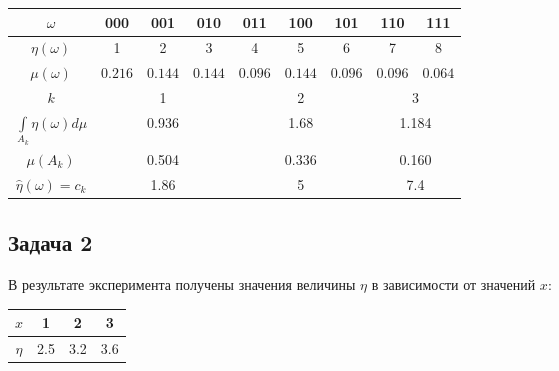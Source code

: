 \documentclass[a4paper,12pt]{article}
\begin{document}
\begin{center}
    \begin{tabular}{|c|c|c|c|c|c|c|c|c|}
        \hline
        $\omega$                                & 000                         & 001                         & 010                         & 011     & 100     & 101     & 110     & 111     \\
        \hline
        $\eta(\omega)$                          & 1                           & 2                           & 3                           & 4       & 5       & 6       & 7       & 8       \\
        \hline
        $\mu(\omega)$                           & $0.216$                     & $0.144$                     & $0.144$                     & $0.096$ & $0.144$ & $0.096$ & $0.096$ & $0.064$ \\
        \hline
        $k$                                     & \multicolumn{3}{|c|}{1}     & \multicolumn{3}{|c|}{2}     & \multicolumn{2}{|c|}{3}                                                       \\
        \hline
        $\int \limits_{A_k} \eta(\omega) d \mu$ & \multicolumn{3}{|c|}{0.936} & \multicolumn{3}{|c|}{1.68}  & \multicolumn{2}{|c|}{1.184}                                                   \\
        \hline
        $\mu(A_k)$                              & \multicolumn{3}{|c|}{0.504} & \multicolumn{3}{|c|}{0.336} & \multicolumn{2}{|c|}{0.160}                                                   \\
        \hline
        $\widehat{\eta}(\omega) = c_k$          & \multicolumn{3}{|c|}{1.86}  & \multicolumn{3}{|c|}{5}     & \multicolumn{2}{|c|}{7.4}                                                     \\
        \hline
    \end{tabular}
\end{center}


\subsection*{Задача 2}

В результате эксперимента получены значения величины $\eta$ в зависимости от значений $x$:

\begin{tabular}{|c|c|c|c|}
    \hline
    $x$    & 1   & 2   & 3   \\
    \hline
    $\eta$ & 2.5 & 3.2 & 3.6 \\
    \hline
\end{tabular}
\end{document}
